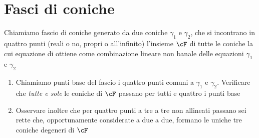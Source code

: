\documentclass[a4paper,NoNotes,GeneralMath]{stdmdoc}
\begin{document}
	\section*{Fasci di coniche}
	Chiamiamo fascio di coniche generato da due coniche $\gamma_1$ e $\gamma_2$, che si incontrano in quattro punti (reali o no, propri o all'infinito) l'insieme $\cF$ di tutte le coniche la cui equazione di ottiene come combinazione lineare non banale delle equazioni $\gamma_1$ e $\gamma_2$
	\begin{enumerate}
		\item Chiamiamo punti base del fascio i quattro punti comuni a $\gamma_1$ e $\gamma_2$. Verificare che {\it tutte e sole} le coniche di $\cF$ passano per tutti e quattro i punti base
		\item Osservare inoltre che per quattro punti a tre a tre non allineati passano sei rette che, opportunamente considerate a due a due, formano le uniche tre coniche degeneri di $\cF$
	\end{enumerate}
	
\end{document}
